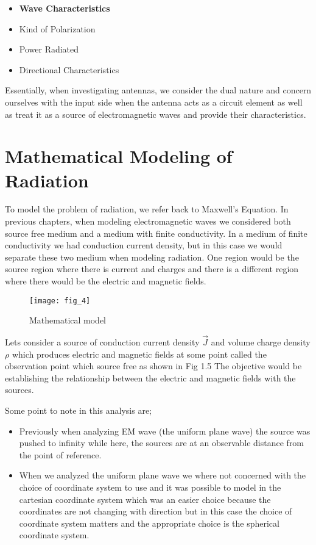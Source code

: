 \begin{itemize}
	\item \textbf{Wave Characteristics}
	\item Kind of Polarization
	\item Power Radiated
	\item Directional Characteristics
\end{itemize}
Essentially, when investigating antennas, we consider the dual nature and concern ourselves with the input side when the antenna acts as a circuit element as well as treat it as a source of electromagnetic waves and provide their characteristics. 

\section{Mathematical Modeling of Radiation}
To model the problem of radiation, we refer back to Maxwell's Equation. In previous chapters, when modeling electromagnetic waves we considered both source free medium and a medium with finite conductivity. In a medium of finite conductivity we had conduction current density, but in this case we would separate these two medium when modeling radiation. One region would be the source region where there is current and charges and there is a different region where there would be the electric and magnetic fields.
\begin{figure}
	\centering
	\texttt{[image: fig\_4]}
	\caption{Mathematical model}
\end{figure}

Lets consider a source of conduction current density $\vec{J}$ and volume charge density $\rho$ which produces electric and magnetic fields at some point called the observation point which source free as shown in Fig 1.5 The objective would be establishing the relationship between the electric and magnetic fields with the sources.

Some point to note in this analysis are;
\begin{itemize}
	\item Previously when analyzing EM wave (the uniform plane wave) the source was pushed to infinity while here, the sources are at an observable distance from the point of reference.
	\item When we analyzed the uniform plane wave we where not concerned with the choice of coordinate system to use and it was possible to model in the cartesian coordinate system which was an easier choice because the coordinates are not changing with direction but in this case the choice of coordinate system matters and the appropriate choice is the spherical coordinate system.
\end{itemize}

